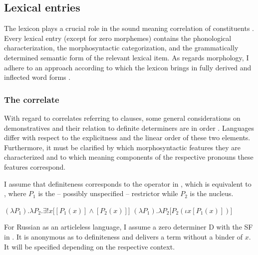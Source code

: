 \documentclass[output=paper,
colorlinks,
citecolor=brown,
newtxmath
]{langscibook}
\begin{document}

\subsection{Lexical entries}\label{s:2.3}

The lexicon plays a crucial role in the sound meaning correlation of constituents \citep[see][]{Zimmermann1987,Zimmermann2018b}. Every lexical entry (except for zero morphemes) contains the phonological characterization, the morphosyntactic categorization, and the grammatically determined semantic form of the relevant lexical item. As regards morphology, I adhere to an approach according to which the lexicon brings in fully derived and inflected word forms \citep[see, a.o.,][]{Zimmermann1987,Zimmermann1988,Zimmermann1990,Zimmermann2013,Zimmermann2018b,Wunderlich1997,Pitsch2014a,Pitsch2014b}.


\subsubsection{The correlate}\label{s:2.3.1}

With regard to correlates referring to clauses, some general considerations on demonstratives and their relation to definite determiners are in order \citep[see, a.o.,][]{Fabricius-Hansen1981,Schwabe2013,SchwabeFreyMeinunger2016}. Languages differ with respect to the explicitness and the linear order of these two elements. Furthermore, it must be clarified by which morphosyntactic features they are characterized and to which meaning components of the respective pronouns these features correspond.

I assume that definiteness corresponds to the operator in , which is equi\-valent to  , where $P_1$ is the -- possibly unspecified -- restrictor while $P_2$ is the nucleus.

\ea
\ea $(\lambda P_1) . \lambda P_2 . \exists!x \big[[P_1 (x)] \wedge [P_2 (x)]\big]$ \label{ex:def1}
\ex $(\lambda P_1) . \lambda P_2 \big[P_2 (\iota x [P_1 (x)])\big]$ \label{ex:def2}
\z\z

\noindent For Russian as an articleless language, I assume a zero determiner D with the SF in . It is anonymous as to definiteness and delivers a term without a binder of $x$. It will be specified depending on the respective context.
\end{document}
